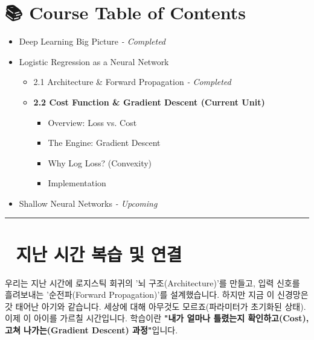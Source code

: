 \documentclass[11pt,a4paper]{book}
\theoremstyle{definition}
\begin{document}
\section*{📚 Course Table of Contents}
\begin{itemize}
    \item[Chapter 1.] Deep Learning Big Picture \textit{- Completed}
    \item[Chapter 2.] Logistic Regression as a Neural Network
    \begin{itemize}
        \item 2.1 Architecture \& Forward Propagation \textit{- Completed}
        \item \textbf{2.2 Cost Function \& Gradient Descent (Current Unit)}
        \begin{itemize}
            \item Overview: Loss vs. Cost
            \item The Engine: Gradient Descent
            \item Why Log Loss? (Convexity)
            \item Implementation
        \end{itemize}
    \end{itemize}
    \item[Chapter 3.] Shallow Neural Networks \textit{- Upcoming}
\end{itemize}

\vspace{0.5cm}
\hrule
\vspace{0.5cm}

\section*{🔗 지난 시간 복습 및 연결}
우리는 지난 시간에 로지스틱 회귀의 '뇌 구조(Architecture)'를 만들고, 입력 신호를 흘려보내는 '순전파(Forward Propagation)'를 설계했습니다. 하지만 지금 이 신경망은 갓 태어난 아기와 같습니다. 세상에 대해 아무것도 모르죠(파라미터가 초기화된 상태). 이제 이 아이를 가르칠 시간입니다. 학습이란 \textbf{"내가 얼마나 틀렸는지 확인하고(Cost), 고쳐 나가는(Gradient Descent) 과정"}입니다.

\end{document}
